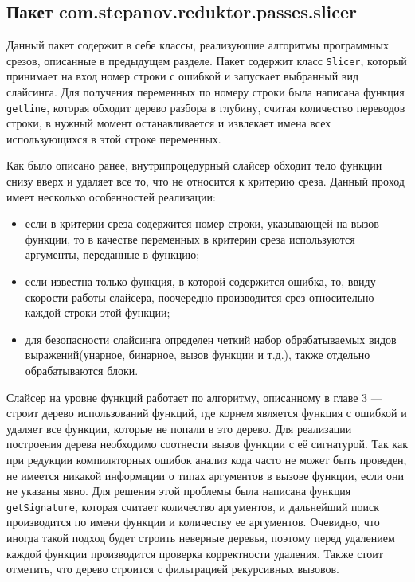 \subsection{Пакет com.stepanov.reduktor.passes.slicer}
Данный пакет содержит в себе классы, реализующие алгоритмы программных срезов, описанные в предыдущем разделе. Пакет содержит класс \texttt{Slicer}, который принимает на вход номер строки с ошибкой и запускает выбранный вид слайсинга. Для получения переменных по номеру строки была написана функция \texttt{getline}, которая обходит дерево разбора в глубину, считая количество переводов строки, в нужный момент останавливается и извлекает имена всех использующихся в этой строке переменных. 

Как было описано ранее, внутрипроцедурный слайсер обходит тело функции снизу вверх и удаляет все то, что не относится к критерию среза. Данный проход имеет несколько особенностей реализации:
\begin{itemize}
	\item если в критерии среза содержится номер строки, указывающей на вызов функции, то в качестве переменных в критерии среза используются аргументы, переданные в функцию;
	\item если известна только функция, в которой содержится ошибка, то, ввиду скорости работы слайсера, поочередно производится срез относительно каждой строки этой функции;
	\item для безопасности слайсинга определен четкий набор обрабатываемых видов выражений(унарное, бинарное, вызов функции и т.д.), также отдельно обрабатываются блоки.
\end{itemize}

Слайсер на уровне функций работает по алгоритму, описанному в главе 3 --- строит дерево использований функций, где корнем является функция с ошибкой и удаляет все функции, которые не попали в это дерево. Для реализации построения дерева необходимо соотнести вызов функции с её сигнатурой. Так как при редукции компиляторных ошибок анализ кода часто не может быть проведен, не имеется никакой информации о типах аргументов в вызове функции, если они не указаны явно. Для решения этой проблемы была написана функция \texttt{getSignature}, которая считает количество аргументов, и дальнейший поиск производится по имени функции и количеству ее аргументов. Очевидно, что иногда такой подход будет строить неверные деревья, поэтому перед удалением каждой функции производится проверка корректности удаления. Также стоит отметить, что дерево строится с фильтрацией рекурсивных вызовов.

